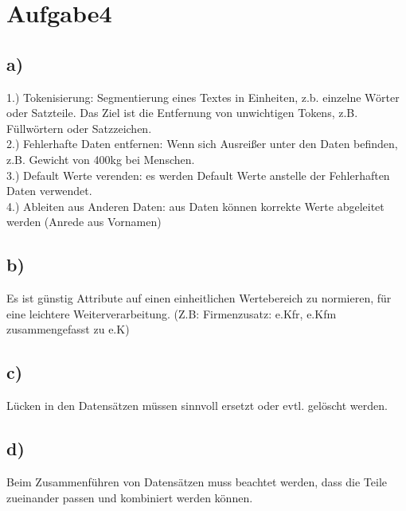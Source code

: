\newpage
\section{Aufgabe4}
\label{sec:a4}

\subsection{a)}
\label{subsec:a4a}
1.) Tokenisierung: Segmentierung eines Textes in Einheiten, z.b. einzelne Wörter oder Satzteile.
    Das Ziel ist die Entfernung von unwichtigen Tokens, z.B. Füllwörtern oder Satzzeichen.\\
2.) Fehlerhafte Daten entfernen: Wenn sich Ausreißer unter den Daten befinden, z.B. Gewicht von 400kg bei Menschen.\\
3.) Default Werte verenden: es werden Default Werte anstelle der Fehlerhaften Daten verwendet.\\
4.) Ableiten aus Anderen Daten: aus Daten können korrekte Werte abgeleitet werden (Anrede aus Vornamen)\\
\subsection{b)}
\label{subsec:a4b}
 Es ist günstig Attribute auf einen einheitlichen Wertebereich zu normieren, für eine leichtere Weiterverarbeitung.
 (Z.B: Firmenzusatz: e.Kfr, e.Kfm zusammengefasst zu e.K)

\subsection{c)}
\label{subsec:a4c}
Lücken in den Datensätzen müssen sinnvoll ersetzt oder evtl. gelöscht werden.

\subsection{d)}
\label{subsec:a4d}
Beim Zusammenführen von Datensätzen muss beachtet werden, dass die Teile zueinander passen und kombiniert werden können.
